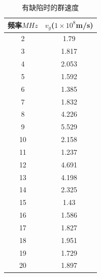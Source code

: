 \documentclass[fleqn,10pt]{SelfArx} %
\begin{document}
\begin{table}[h]
	\centering
	\begin{tabular}{|c|c|}
	\hline
	频率$MHz$ & $v_g$($1\times10^8$m/s) \\ \hline
	2       & 1.79                    \\ \hline
	3       & 1.817                   \\ \hline
	4       & 2.053                   \\ \hline
	5       & 1.592                   \\ \hline
	6       & 1.385                   \\ \hline
	7       & 1.832                   \\ \hline
	8       & 4.226                   \\ \hline
	9       & 5.529                   \\ \hline
	10      & 2.158                   \\ \hline
	11      & 1.237                   \\ \hline
	12      & 4.691                   \\ \hline
	13      & 4.198                   \\ \hline
	14      & 2.325                   \\ \hline
	15      & 1.43                    \\ \hline
	16      & 1.586                   \\ \hline
	17      & 1.827                   \\ \hline
	18      & 1.951                   \\ \hline
	19      & 1.729                   \\ \hline
	20      & 1.897                   \\ \hline
	\end{tabular}
	\caption{有缺陷时的群速度}
	\label{tab:app6}
\end{table}

\end{document}
